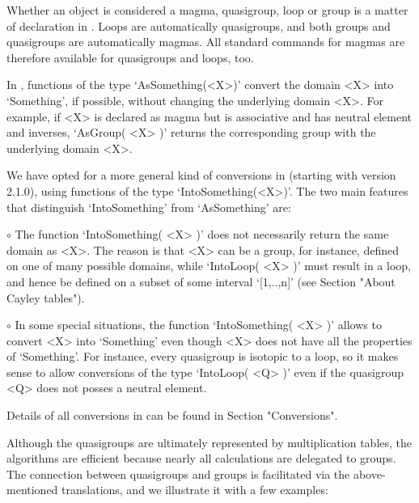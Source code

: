 
Whether an object is considered a magma, quasigroup, loop or group is a matter
of declaration in {\LOOPS}. Loops are automatically quasigroups, and both
groups and quasigroups are automatically magmas. All standard {\GAP} commands
for magmas are therefore available for quasigroups and loops, too.

In {\GAP}, functions of the type `AsSomething(<X>)' convert the domain <X> into
`Something', if possible, without changing the underlying domain <X>. For
example, if <X> is declared as magma but is associative and has neutral element
and inverses, `AsGroup( <X> )' returns the corresponding group with the
underlying domain <X>.

We have opted for a more general kind of conversions in {\LOOPS} (starting with
version 2.1.0), using functions of the type `IntoSomething(<X>)'. The two main
features that distinguish `IntoSomething' from `AsSomething' are:

\beginlist%
\item{$\circ$}
    The function `IntoSomething( <X> )' does not necessarily return the same
    domain as <X>. The reason is that <X> can be a group, for instance, defined on
    one of many possible domains, while `IntoLoop( <X> )' must result in a loop,
    and hence be defined on a subset of some interval `[1,..,n]' (see Section
    "About Cayley tables").
\item{$\circ$}
    In some special situations, the function `IntoSomething( <X> )' allows to
    convert <X> into `Something' even though <X> does not have all the properties
    of `Something'. For instance, every quasigroup is isotopic to a loop, so it
    makes sense to allow conversions of the type `IntoLoop( <Q> )' even if the
    quasigroup <Q> does not posses a neutral element.
\endlist

Details of all conversions in {\LOOPS} can be found in Section "Conversions".


Although the quasigroups are ultimately represented by multiplication tables,
the algorithms are efficient because nearly all calculations are delegated to
groups. The connection between quasigroups and groups is facilitated via the
above-mentioned translations, and we illustrate it with a few examples:

